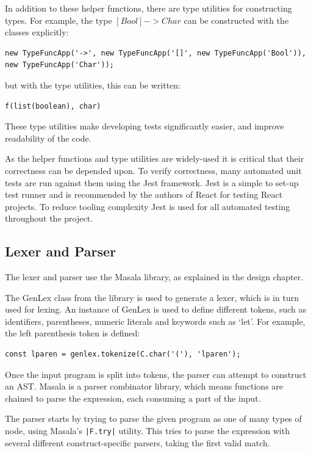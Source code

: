 \documentclass[a4paper,fleqn,oneside,12pt]{report}
\begin{document}
In addition to these helper functions, there are type utilities for constructing types. For example, the type $[Bool] -> Char$ can be constructed with the classes explicitly:

\begin{verbatim}
new TypeFuncApp('->', new TypeFuncApp('[]', new TypeFuncApp('Bool')), new TypeFuncApp('Char'));
\end{verbatim}

but with the type utilities, this can be written:

\begin{verbatim}
f(list(boolean), char)
\end{verbatim}

These type utilities make developing tests significantly easier, and improve readability of the code.

As the helper functions and type utilities are widely-used it is critical that their correctness can be depended upon. To verify correctness, many automated unit tests are run against them using the Jest framework. Jest is a simple to set-up test runner and is recommended by the authors of React for testing React projects. To reduce tooling complexity Jest is used for all automated testing throughout the project.
\subsection{Lexer and Parser}\label{id:h.qbtwwllp8tw6}
The lexer and parser use the Masala library, as explained in the design chapter.

The GenLex class from the library is used to generate a lexer, which is in turn used for lexing. An instance of GenLex is used to define different tokens, such as identifiers, parentheses, numeric literals and keywords such as ‘let’. For example, the left parenthesis token is defined:

\begin{verbatim}
const lparen = genlex.tokenize(C.char('('), 'lparen');
\end{verbatim}

Once the input program is split into tokens, the parser can attempt to construct an AST. Masala is a parser combinator library, which means functions are chained to parse the expression, each consuming a part of the input.

The parser starts by trying to parse the given program as one of many types of node, using Masala’s \texttt{|F.try|} utility. This tries to parse the expression with several different construct-specific parsers, taking the first valid match.
\end{document}
